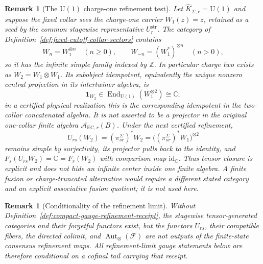 \documentclass[11pt]{article}
\newtheorem{remark}[theorem]{Remark}
\newcommand{\U}{\mathrm{U}}
\begin{document}
\begin{remark}[The \(\U(1)\) charge-one refinement test]\label{rem:u1-charge-refinement-test}
Let \(\widehat K_{\Sigma,r}=\U(1)\) and suppose the fixed collar sees the charge-one carrier
\(W_1(z)=z\), retained as a seed by the common stagewise representative
\(U^{\mathrm{str}}_r\). The category of Definition~\ref{def:fixed-cutoff-collar-sectors} contains
\[
W_n=W_1^{\otimes n}\quad(n\geq 0),
\qquad
W_{-n}=(W_1^*)^{\otimes n}\quad(n>0),
\]
so it has the infinite simple family indexed by \(\mathbb Z\). In particular charge two exists as
\(W_2=W_1\otimes W_1\). Its subobject idempotent, equivalently the unique nonzero central
projection in its intertwiner algebra, is
\[
\mathbf 1_{W_2}\in
\operatorname{End}_{\U(1)}(W_1^{\otimes2})\cong\mathbb C;
\]
in a certified physical realization this is the corresponding idempotent in the two-collar
concatenated algebra. It is not asserted to be a projector in the original one-collar finite
algebra \(\mathcal A_{\mathrm{EC},r}(B)\). Under the next certified refinement,
\[
U_{rs}(W_2)=(\pi_{sr}^{\Sigma})^*W_2
=\bigl((\pi_{sr}^{\Sigma})^*W_1\bigr)^{\otimes2}
\]
remains simple by surjectivity, its projector pulls back to the identity, and
\(F_s(U_{rs}W_2)=\mathbb C=F_r(W_2)\) with comparison map
\(\mathrm{id}_{\mathbb C}\). Thus tensor closure is explicit and does not hide an infinite center
inside one finite algebra. A finite fusion or charge-truncated alternative would require a
different stated category and an explicit associative fusion quotient; it is not used here.
\end{remark}

\begin{remark}[Conditionality of the refinement limit]\label{rem:refinement-receipt-conditionality}
Without Definition~\ref{def:compact-gauge-refinement-receipt}, the stagewise tensor-generated
categories and their forgetful functors exist, but the functors \(U_{rs}\), their compatible
fibers, the directed colimit, and \(\operatorname{Aut}_\otimes(\mathcal F)\) are not outputs of the
finite-state consensus refinement maps. All refinement-limit gauge statements below are therefore
conditional on a cofinal tail carrying that receipt.
\end{remark}
\end{document}
